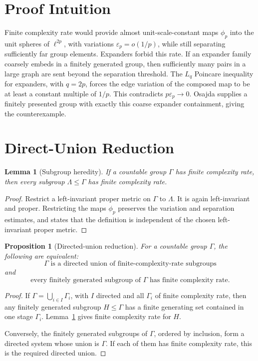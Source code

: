\documentclass[11pt]{article}
\newtheorem{lemma}[theorem]{Lemma}
\newtheorem{proposition}[theorem]{Proposition}
\newcommand{\eps}{\varepsilon}
\begin{document}
\section*{Proof Intuition}

Finite complexity rate would provide almost unit-scale-constant maps
\(\phi_p\) into the unit spheres of \(\ell^{2p}\), with variations
\(\eps_p=o(1/p)\), while still separating sufficiently far group elements.
Expanders forbid this rate.  If an expander family coarsely embeds in a
finitely generated group, then sufficiently many pairs in a large graph are
sent beyond the separation threshold.  The \(L_q\) Poincare inequality for
expanders, with \(q=2p\), forces the edge variation of the composed map to be
at least a constant multiple of \(1/p\).  This contradicts \(p\eps_p\to 0\).
Osajda supplies a finitely presented group with exactly this coarse expander
containment, giving the counterexample.

\section*{Direct-Union Reduction}

\begin{lemma}[Subgroup heredity]\label{lem:subgroup}
If a countable group \(\Gamma\) has finite complexity rate, then every subgroup
\(\Lambda\leq\Gamma\) has finite complexity rate.
\end{lemma}

\begin{proof}
Restrict a left-invariant proper metric on \(\Gamma\) to \(\Lambda\).  It is
again left-invariant and proper.  Restricting the maps \(\phi_p\) preserves the
variation and separation estimates, and \cite{TianYu2026} states that the
definition is independent of the chosen left-invariant proper metric.
\end{proof}

\begin{proposition}[Directed-union reduction]\label{prop:directunion}
For a countable group \(\Gamma\), the following are equivalent:
\[
\Gamma \text{ is a directed union of finite-complexity-rate subgroups}
\]
and
\[
\text{every finitely generated subgroup of } \Gamma
\text{ has finite complexity rate.}
\]
\end{proposition}

\begin{proof}
If \(\Gamma=\bigcup_{i\in I}\Gamma_i\), with \(I\) directed and all
\(\Gamma_i\) of finite complexity rate, then any finitely generated subgroup
\(H\leq\Gamma\) has a finite generating set contained in one stage
\(\Gamma_i\).  Lemma~\ref{lem:subgroup} gives finite complexity rate for
\(H\).

Conversely, the finitely generated subgroups of \(\Gamma\), ordered by
inclusion, form a directed system whose union is \(\Gamma\).  If each of them
has finite complexity rate, this is the required directed union.
\end{proof}
\end{document}
